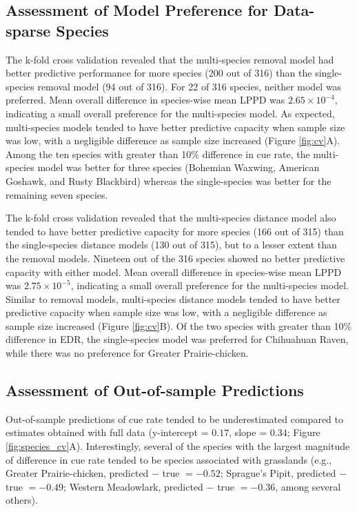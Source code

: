 \documentclass[12pt]{article}
\begin{document}
\subsection{Assessment of Model Preference for Data-sparse Species}

\par The k-fold cross validation revealed that the multi-species removal model had better predictive performance for more species (200 out of 316) than the single-species removal model (94 out of 316).
For 22 of 316 species, neither model was preferred.
Mean overall difference in species-wise mean LPPD was $2.65 \times 10^{-4}$, indicating a small overall preference for the multi-species model.
As expected, multi-species models tended to have better predictive capacity when sample size was low, with a negligible difference as sample size increased (Figure \ref{fig:cv}A).
Among the ten species with greater than 10\% difference in cue rate, the multi-species model was better for three species (Bohemian Waxwing, American Goshawk, and Rusty Blackbird) whereas the single-species was better for the remaining seven species.

\par The k-fold cross validation revealed that the multi-species distance model also tended to have better predictive capacity for more species (166 out of 315) than the single-species distance models (130 out of 315), but to a lesser extent than the removal models.
Nineteen out of the 316 species showed no better predictive capacity with either model.
Mean overall difference in species-wise mean LPPD was $2.75 \times 10^{-5}$, indicating a small overall preference for the multi-species model.
Similar to removal models, multi-species distance models tended to have better predictive capacity when sample size was low, with a negligible difference as sample size increased (Figure \ref{fig:cv}B).
Of the two species with greater than 10\% difference in EDR, the single-species model was preferred for Chihuahuan Raven, while there was no preference for Greater Prairie-chicken.

\subsection{Assessment of Out-of-sample Predictions}

\par Out-of-sample predictions of cue rate tended to be underestimated compared to estimates obtained with full data (y-intercept = $0.17$, slope = $0.34$; Figure \ref{fig:species_cv}A).
Interestingly, several of the species with the largest magnitude of difference in cue rate tended to be species associated with grasslands (e.g., Greater Prairie-chicken, predicted $-$ true $= -0.52$; Sprague's Pipit, predicted $-$ true $= -0.49$; Western Meadowlark, predicted $-$ true $= -0.36$, among several others).
\end{document}
